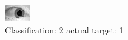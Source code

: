 \begin{figure}[h!]
\begin{center}
\includegraphics[width=0.60\columnwidth]{figures/ID1599_class_2_target_1.png}
\end{center}
\caption{ Classification: 2 actual target: 1}
\label{fig:ID1599_class_2_target_1}
\end{figure}
